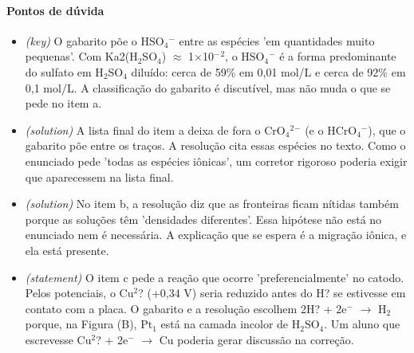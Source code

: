 \documentclass{article}%
\begin{document}
\paragraph{Pontos de dúvida}%
\begin{itemize}%
\item%
\textit{(key)} O gabarito põe o HSO$_{4}$$^{-}$ entre as espécies 'em quantidades muito pequenas'. Com Ka2(H$_{2}$SO$_{4}$) $\approx$ 1$\times$10$^{-}$$^2$, o HSO$_{4}$$^{-}$ é a forma predominante do sulfato em H$_{2}$SO$_{4}$ diluído: cerca de 59\% em 0,01 mol/L e cerca de 92\% em 0,1 mol/L. A classificação do gabarito é discutível, mas não muda o que se pede no item a.%
\item%
\textit{(solution)} A lista final do item a deixa de fora o CrO$_{4}$$^2$$^{-}$ (e o HCrO$_{4}$$^{-}$), que o gabarito põe entre os traços. A resolução cita essas espécies no texto. Como o enunciado pede 'todas as espécies iônicas', um corretor rigoroso poderia exigir que aparecessem na lista final.%
\item%
\textit{(solution)} No item b, a resolução diz que as fronteiras ficam nítidas também porque as soluções têm 'densidades diferentes'. Essa hipótese não está no enunciado nem é necessária. A explicação que se espera é a migração iônica, e ela está presente.%
\item%
\textit{(statement)} O item c pede a reação que ocorre 'preferencialmente' no catodo. Pelos potenciais, o Cu$^2$? (+0,34 V) seria reduzido antes do H? se estivesse em contato com a placa. O gabarito e a resolução escolhem 2H? + 2e$^{-}$ $\to$ H$_{2}$ porque, na Figura (B), Pt$_{1}$ está na camada incolor de H$_{2}$SO$_{4}$. Um aluno que escrevesse Cu$^2$? + 2e$^{-}$ $\to$ Cu poderia gerar discussão na correção.%
\end{itemize}%
\end{document}
